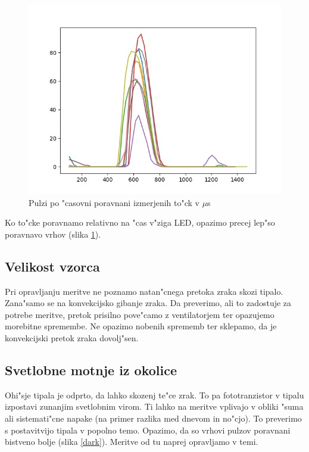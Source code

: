 \documentclass[11pt,a4paper]{article}
\begin{document}
\begin{figure}[H]
	\begin{center}
		\includegraphics[width=12cm]{aligned.png}
		\caption{Pulzi po "casovni poravnani izmerjenih to"ck v $\mu$s}
		\label{aligned}
	\end{center}
\end{figure}

Ko to"cke poravnamo relativno na "cas v"ziga LED, opazimo precej lep"so poravnavo vrhov (slika \ref{aligned}).

\subsection{Velikost vzorca}
Pri opravljanju meritve ne poznamo natan"cnega pretoka zraka skozi tipalo. Zana"samo se na konvekcijsko gibanje zraka. Da preverimo, ali to zadostuje za potrebe meritve, pretok prisilno pove"camo z ventilatorjem ter opazujemo morebitne spremembe. Ne opazimo nobenih sprememb ter sklepamo, da je konvekcijski pretok zraka dovolj"sen.

\subsection{Svetlobne motnje iz okolice}
Ohi"sje tipala je odprto, da lahko skozenj te"ce zrak. To pa fototranzistor v tipalu izpostavi zunanjim svetlobnim virom. Ti lahko na meritve vplivajo v obliki "suma ali sistemati"cne napake (na primer razlika med dnevom in no"cjo). To preverimo s postavitvijo tipala v popolno temo. Opazimo, da so vrhovi pulzov poravnani bistveno bolje (slika \ref{dark}). Meritve od tu naprej opravljamo v temi.
\end{document}
